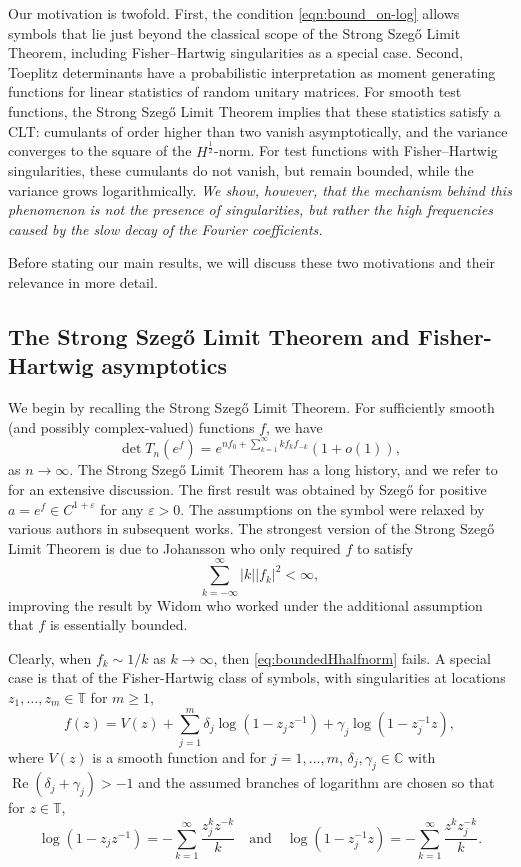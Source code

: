 \documentclass[11pt]{amsart}
\theoremstyle{plain}
\theoremstyle{remark}
\renewcommand{\Re}{\mathop{\mathrm{Re}}}
\numberwithin{equation}{section}
\begin{document}
Our motivation is twofold. First, the condition \eqref{eqn:bound_on-log} allows symbols that lie just beyond the classical scope of the Strong Szeg\H{o} Limit Theorem, including Fisher--Hartwig singularities as a special case. Second, Toeplitz determinants have a probabilistic interpretation as moment generating functions for linear statistics of random unitary matrices. For smooth test functions, the Strong Szeg\H{o} Limit Theorem implies that these statistics satisfy a CLT: cumulants of order higher than two vanish asymptotically, and the variance converges to the square of the $H^{\frac12}$-norm. For test functions with Fisher--Hartwig singularities, these cumulants do not vanish, but remain bounded, while the variance grows logarithmically.  \emph{We show, however, that the mechanism behind this phenomenon is not the presence of singularities, but rather the high frequencies caused by the slow decay of the Fourier coefficients.}

Before stating our main results, we will discuss these two motivations and their relevance in more detail.

\subsection{The Strong Szeg\H{o} Limit Theorem and Fisher-Hartwig asymptotics}
We begin by recalling the Strong Szeg\H{o} Limit Theorem. For sufficiently smooth (and possibly complex-valued) functions $f$, we have 
\begin{equation}\label{eq:SSLT}
    \det T_n(e^{f})= e^{n f_0+ \sum_{k=1}^\infty k f_k f_{-k}}(1+o(1)),
\end{equation}
as $n \to \infty$. The Strong Szeg\H{o} Limit Theorem has a long history, and  we refer to \cite{DIK} for an extensive discussion. The first result was obtained by Szeg\H{o} \cite{Sz3} for positive  $a=e^f \in C^{1+\varepsilon}$ for any $\varepsilon>0$. The assumptions on the symbol were relaxed by various authors in subsequent works. The strongest version of the Strong Szeg\H{o} Limit Theorem is due to Johansson \cite{Joh1} who only required $f$ to satisfy
\begin{equation}\label{eq:boundedHhalfnorm}
\sum_{k=-\infty}^\infty |k| |f_k|^2 < \infty,
\end{equation}
improving the result by Widom \cite{Wid4} who worked under the additional assumption that $f$ is essentially bounded. 

Clearly, when $f_k\sim 1/k$ as $k \to \infty$, then \eqref{eq:boundedHhalfnorm} fails.  A special case is that of the Fisher-Hartwig class of symbols, with singularities at locations $z_1, \ldots, z_m\in\mathbb{T}$ for $m\geq 1$,
\begin{equation}\label{eqn:fh_log}
f(z)
=V(z)+\sum_{j=1}^{m} \delta_j\log\left(1-{z_j}z^{-1}\right)+\gamma_j\log\left(1-z_j^{-1}z\right),
\end{equation}
where
$V(z)$ is a smooth function and
for $j=1,\ldots, m$, $\delta_j,\gamma_j\in\mathbb{C}$ with
$\Re(\delta_j+\gamma_j)> -1$ and 
the assumed branches of logarithm are chosen so that for $z\in\mathbb{T}$,
$$\log(1-z_jz^{-1})=-\sum_{k=1}^{\infty} \frac{z_j^kz^{-k}}{k}\quad\text{and}\quad 
\log(1-z_j^{-1}z)=-\sum_{k=1}^{\infty} \frac{z^kz_j^{-k}}{k}.
$$
\end{document}
